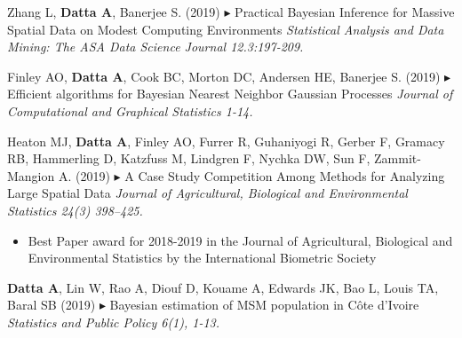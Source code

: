 \documentclass[12pt]{article}
\newcommand{\mine}{
  \addtocounter{enumi}{1}
\item[\fcolorbox{white}{grey}{\color{white} \tiny \arabic{enumi}}]
}
\newcommand{\dg}[1]{{\color{black} $\blacktriangleright$ {#1}}}
\begin{document}
\item Zhang L, \textbf{Datta A}, Banerjee S. (2019) {\dg Practical Bayesian Inference for Massive Spatial Data on Modest Computing Environments}
{\it Statistical Analysis and Data Mining: The ASA Data Science Journal 12.3:197-209.}

\item Finley AO, \textbf{Datta A}, Cook BC, Morton DC, Andersen HE, Banerjee S. (2019)
{\dg Efficient algorithms for Bayesian Nearest Neighbor Gaussian Processes}
{\it  Journal of Computational and Graphical Statistics 1-14.}

\item  Heaton MJ, \textbf{Datta A}, Finley AO, Furrer R, Guhaniyogi R, Gerber F, Gramacy RB, Hammerling D, Katzfuss M, Lindgren F, Nychka DW, Sun F, Zammit-Mangion A. (2019)
{\dg A Case Study Competition Among Methods for Analyzing Large Spatial Data}
{\it Journal of Agricultural, Biological and Environmental Statistics 24(3) 398--425.}
\begin{itemize}
	\item Best Paper award for 2018-2019 in the Journal of Agricultural, Biological and Environmental Statistics by the International Biometric Society
\end{itemize}

\mine \textbf{Datta A}, Lin W, Rao A, Diouf D, Kouame A, Edwards JK, Bao L, Louis TA, Baral SB (2019)
{\dg Bayesian estimation of MSM population in Côte d’Ivoire}
{\it  Statistics and Public Policy 6(1), 1-13.}
\end{document}
